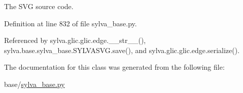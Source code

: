 The S\+VG source code. 



Definition at line 832 of file sylva\+\_\+base.\+py.



Referenced by sylva.\+glic.\+glic.\+edge.\+\_\+\+\_\+str\+\_\+\+\_\+(), sylva.\+base.\+sylva\+\_\+base.\+S\+Y\+L\+V\+A\+S\+V\+G.\+save(), and sylva.\+glic.\+glic.\+edge.\+serialize().



The documentation for this class was generated from the following file\+:\begin{DoxyCompactItemize}
\item 
base/\hyperlink{sylva__base_8py}{sylva\+\_\+base.\+py}\end{DoxyCompactItemize}
